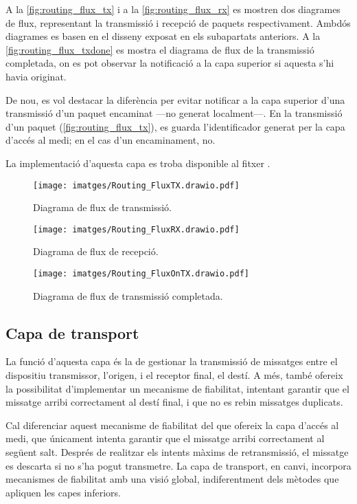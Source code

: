 \documentclass{tfgitic}[2024/07/01]
\begin{document}
{A la \autoref{fig:routing_flux_tx} i a la \autoref{fig:routing_flux_rx} es mostren dos diagrames de flux, representant la transmissió i recepció de paquets respectivament. Ambdós diagrames es basen en el disseny exposat en els subapartats anteriors. A la \autoref{fig:routing_flux_txdone} es mostra el diagrama de flux de la transmissió completada, on es pot observar la notificació a la capa superior si aquesta s'hi havia originat. 

De nou, es vol destacar la diferència per evitar notificar a la capa superior d'una transmissió d'un paquet encaminat ---no generat localment---. En la transmissió d'un paquet (\autoref{fig:routing_flux_tx}), es guarda l'identificador generat per la capa d'accés al medi; en el cas d'un encaminament, no.

La implementació d'aquesta capa es troba disponible al fitxer .

\begin{figure}
    \centering
        \texttt{[image: imatges/Routing\_FluxTX.drawio.pdf]}
    \caption{Diagrama de flux de transmissió.}
    \label{fig:routing_flux_tx}
\end{figure}

\begin{figure}
    \centering
        \texttt{[image: imatges/Routing\_FluxRX.drawio.pdf]}
    \caption{Diagrama de flux de recepció.}
    \label{fig:routing_flux_rx}
\end{figure}

\begin{figure}
    \centering
        \texttt{[image: imatges/Routing\_FluxOnTX.drawio.pdf]}
    \caption{Diagrama de flux de transmissió completada.}
    \label{fig:routing_flux_txdone}
\end{figure}

\subsection{Capa de transport}
La funció d'aquesta capa és la de gestionar la transmissió de missatges entre el dispositiu transmissor, l'origen, i el receptor final, el destí. A més, també ofereix la possibilitat d'implementar un mecanisme de fiabilitat, intentant garantir que el missatge arribi correctament al destí final, i que no es rebin missatges duplicats. 

Cal diferenciar aquest mecanisme de fiabilitat del que ofereix la capa d'accés al medi, que únicament intenta garantir que el missatge arribi correctament al següent salt. Després de realitzar els intents màxims de retransmissió, el missatge es descarta si no s'ha pogut transmetre. La capa de transport, en canvi, incorpora mecanismes de fiabilitat amb una visió global, indiferentment dels mètodes que apliquen les capes inferiors.

}
\end{document}
